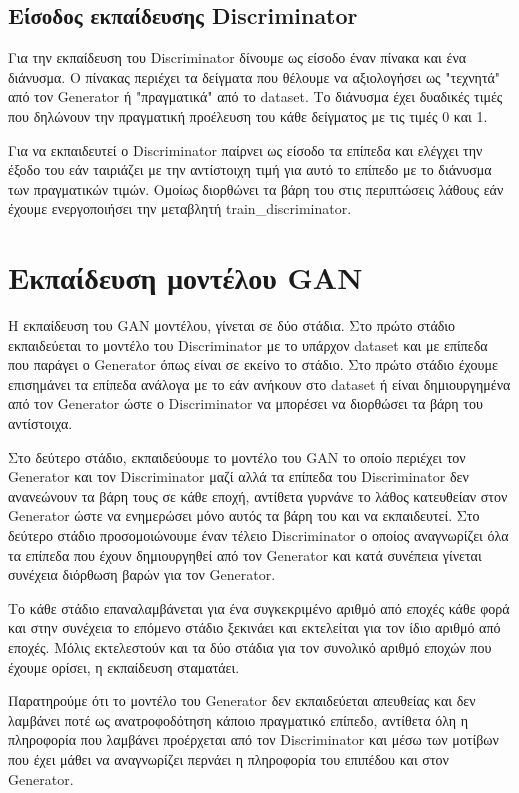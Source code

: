 \subsection{Είσοδος εκπαίδευσης Discriminator}
Για την εκπαίδευση του Discriminator δίνουμε ως είσοδο έναν πίνακα και ένα διάνυσμα. Ο πίνακας περιέχει τα δείγματα που θέλουμε να αξιολογήσει ως "τεχνητά" από τον Generator ή "πραγματικά" από το dataset. Το διάνυσμα έχει δυαδικές τιμές που δηλώνουν την πραγματική προέλευση του κάθε δείγματος με τις τιμές 0 και 1.
\par
Για να εκπαιδευτεί ο Discriminator παίρνει ως είσοδο τα επίπεδα και ελέγχει την έξοδο του εάν ταιριάζει με την αντίστοιχη τιμή για αυτό το επίπεδο με το διάνυσμα των πραγματικών τιμών. Ομοίως διορθώνει τα βάρη του στις περιπτώσεις λάθους εάν έχουμε ενεργοποιήσει την μεταβλητή train\_discriminator.

\section{Εκπαίδευση μοντέλου GAN}
\par
Η εκπαίδευση του GAN μοντέλου, γίνεται σε δύο στάδια. Στο πρώτο στάδιο εκπαιδεύεται το μοντέλο του Discriminator με το υπάρχον dataset και με επίπεδα που παράγει ο Generator όπως είναι σε εκείνο το στάδιο. Στο πρώτο στάδιο έχουμε επισημάνει τα επίπεδα ανάλογα με το εάν ανήκουν στο dataset ή είναι δημιουργημένα από τον Generator ώστε ο Discriminator να μπορέσει να διορθώσει τα βάρη του αντίστοιχα.
\par
Στο δεύτερο στάδιο, εκπαιδεύουμε το μοντέλο του GAN το οποίο περιέχει τον Generator και τον Discriminator μαζί αλλά τα επίπεδα του Discriminator δεν ανανεώνουν τα βάρη τους σε κάθε εποχή, αντίθετα γυρνάνε το λάθος κατευθείαν στον Generator ώστε να ενημερώσει μόνο αυτός τα βάρη του και να εκπαιδευτεί. Στο δεύτερο στάδιο προσομοιώνουμε έναν τέλειο Discriminator ο οποίος αναγνωρίζει όλα τα επίπεδα που έχουν δημιουργηθεί από τον Generator και κατά συνέπεια γίνεται συνέχεια διόρθωση βαρών για τον Generator.
\par
Το κάθε στάδιο επαναλαμβάνεται για ένα συγκεκριμένο αριθμό από εποχές κάθε φορά και στην συνέχεια το επόμενο στάδιο ξεκινάει και εκτελείται για τον ίδιο αριθμό από εποχές. Μόλις εκτελεστούν και τα δύο στάδια για τον συνολικό αριθμό εποχών που έχουμε ορίσει, η εκπαίδευση σταματάει.
\par
Παρατηρούμε ότι το μοντέλο του Generator δεν εκπαιδεύεται απευθείας και δεν λαμβάνει ποτέ ως ανατροφοδότηση κάποιο πραγματικό επίπεδο, αντίθετα όλη η πληροφορία που λαμβάνει προέρχεται από τον Discriminator και μέσω των μοτίβων που έχει μάθει να αναγνωρίζει περνάει η πληροφορία του επιπέδου και στον Generator.



